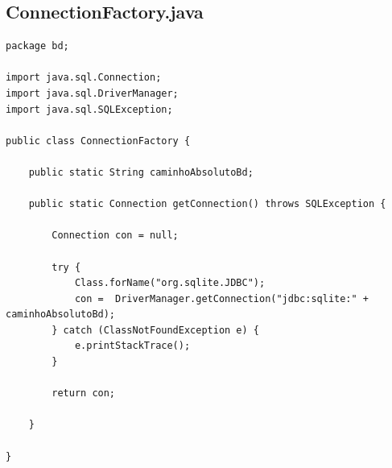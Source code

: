 \documentclass[11pt,twoside]{article}
\begin{document}
\subsection{ConnectionFactory.java}       %
\begin{verbatim}
package bd;

import java.sql.Connection;
import java.sql.DriverManager;
import java.sql.SQLException;

public class ConnectionFactory {
	
	public static String caminhoAbsolutoBd;
	
	public static Connection getConnection() throws SQLException {

		Connection con = null;

		try {
			Class.forName("org.sqlite.JDBC");
			con =  DriverManager.getConnection("jdbc:sqlite:" + caminhoAbsolutoBd);
		} catch (ClassNotFoundException e) {
			e.printStackTrace();
		}

		return con;
		
	}

}
\end{verbatim}


\end{document}
